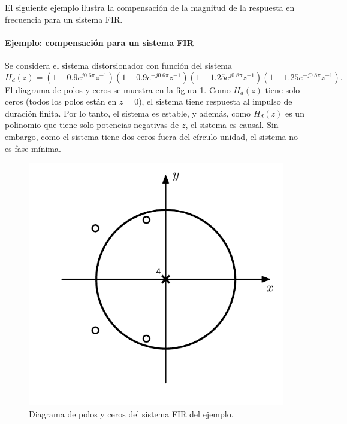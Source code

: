 \documentclass[a4paper]{report}
\begin{document}
El siguiente ejemplo ilustra la compensación de la magnitud de la respuesta en frecuencia para un sistema FIR.

\paragraph{Ejemplo: compensación para un sistema FIR} Se considera el sistema distorsionador con función del sistema
\begin{equation}\label{eq:transform_analysis_example_5_13_H_d}
 H_d(z)=(1-0.9e^{j0.6\pi}z^{-1})(1-0.9e^{-j0.6\pi}z^{-1})(1-1.25e^{j0.8\pi}z^{-1})(1-1.25e^{-j0.8\pi}z^{-1}). 
\end{equation}
El diagrama de polos y ceros se muestra en la figura \ref{fig:example_5_13_zero_pole_plot}. Como \(H_d(z)\) tiene solo ceros (todos los polos están en \(z=0\)), el sistema tiene respuesta al impulso de duración finita. Por lo tanto, el sistema es estable, y además, como \(H_d(z)\) es un polinomio que tiene solo potencias negativas de \(z\), el sistema es causal. Sin embargo, como el sistema tiene dos ceros fuera del círculo unidad, el sistema no es fase mínima.
\begin{figure}[!htb]
  \begin{minipage}[c]{0.45\textwidth}
    \includegraphics[width=\textwidth]{figuras/example_5_13_zero_pole_plot.pdf}
  \end{minipage}\hfill
  \begin{minipage}[c]{0.45\textwidth}
    \caption{
      Diagrama de polos y ceros del sistema FIR del ejemplo.
    }\label{fig:example_5_13_zero_pole_plot}
  \end{minipage}
\end{figure}
\end{document}
